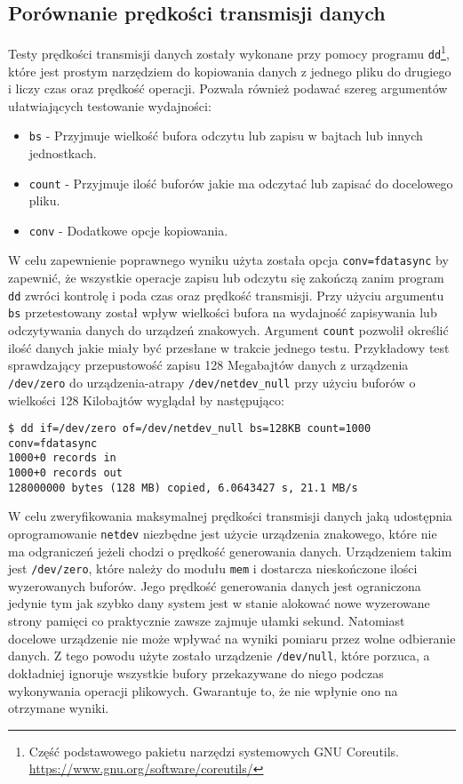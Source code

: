 \documentclass[10pt]{article}
\begin{document}
\subsection{Porównanie prędkości transmisji danych}

Testy prędkości transmisji danych zostały wykonane przy pomocy programu \texttt{dd}\footnote{Część podstawowego pakietu narzędzi systemowych GNU Coreutils. \url{https://www.gnu.org/software/coreutils/}}, które jest prostym narzędziem do kopiowania danych z jednego pliku do drugiego i liczy czas oraz prędkość operacji. Pozwala również podawać szereg argumentów ułatwiających testowanie wydajności:

\begin{itemize}
    \item \texttt{bs} - Przyjmuje wielkość bufora odczytu lub zapisu w bajtach lub innych jednostkach.
    \item \texttt{count} - Przyjmuje ilość buforów jakie ma odczytać lub zapisać do docelowego pliku.
    \item \texttt{conv} - Dodatkowe opcje kopiowania.
\end{itemize}

W celu zapewnienie poprawnego wyniku użyta została opcja \texttt{conv=fdatasync} by zapewnić, że wszystkie operacje zapisu lub odczytu się zakończą zanim program \texttt{dd} zwróci kontrolę i poda czas oraz prędkość transmisji. Przy użyciu argumentu \texttt{bs} przetestowany został wpływ wielkości bufora na wydajność zapisywania lub odczytywania danych do urządzeń znakowych. Argument \texttt{count} pozwolił określić ilość danych jakie miały być przesłane w trakcie jednego testu. Przykładowy test sprawdzający przepustowość zapisu 128 Megabajtów danych z urządzenia \texttt{/dev/zero} do urządzenia-atrapy \texttt{/dev/netdev\_null} przy użyciu buforów o wielkości 128 Kilobajtów wyglądał by następująco:

\begin{verbatim}
$ dd if=/dev/zero of=/dev/netdev_null bs=128KB count=1000 conv=fdatasync
1000+0 records in
1000+0 records out
128000000 bytes (128 MB) copied, 6.0643427 s, 21.1 MB/s
\end{verbatim}

W celu zweryfikowania maksymalnej prędkości transmisji danych jaką udostępnia oprogramowanie \texttt{netdev} niezbędne jest użycie urządzenia znakowego, które nie ma odgraniczeń jeżeli chodzi o prędkość generowania danych. Urządzeniem takim jest \texttt{/dev/zero}, które należy do modułu \texttt{mem} i dostarcza nieskończone ilości wyzerowanych buforów. Jego prędkość generowania danych jest ograniczona jedynie tym jak szybko dany system jest w stanie alokować nowe wyzerowane strony pamięci co praktycznie zawsze zajmuje ułamki sekund. Natomiast docelowe urządzenie nie może wpływać na wyniki pomiaru przez wolne odbieranie danych. Z tego powodu użyte zostało urządzenie \texttt{/dev/null}, które porzuca, a dokładniej ignoruje wszystkie bufory przekazywane do niego podczas wykonywania operacji plikowych. Gwarantuje to, że nie wpłynie ono na otrzymane wyniki.
\end{document}
